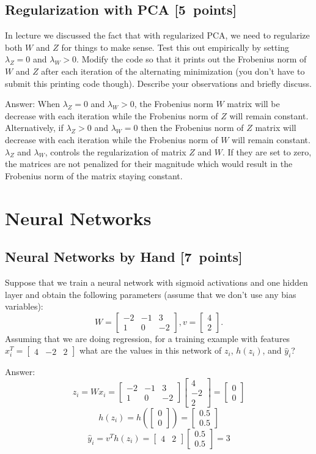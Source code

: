 \documentclass{article}
\newcommand{\blu}[1]{{\textcolor{blu}{#1}}}
\newenvironment{answer}{\par\begingroup\color{gre}Answer: }{\endgroup}
\let\ask\blu
\newcommand\pts[1]{\textcolor{pointscolour}{[#1~points]}}
\newcommand{\mat}[1]{\begin{bmatrix}#1\end{bmatrix}}
\begin{document}
\subsection{Regularization with PCA \pts{5}}

In lecture we discussed the fact that with regularized PCA, we need to regularize both $W$ and $Z$ for things to make sense. Test this out empirically by setting $\lambda_Z=0$ and $\lambda_W>0$. Modify the code so that it prints out the Frobenius norm of $W$ and $Z$ after each iteration of the alternating minimization (you don't have to submit this printing code though). \ask{Describe your observations and briefly discuss.}
\begin{answer}
    When  $\lambda_Z=0$ and $\lambda_W>0$, the Frobenius norm $W$ matrix will be decrease with each iteration while the Frobenius norm of $Z$ will remain constant. Alternatively, if $\lambda_Z>0$ and $\lambda_W=0$ then the Frobenius norm of $Z$ matrix will decrease with each iteration while the Frobenius norm of $W$ will remain constant. $\lambda_Z$ and $\lambda_W$, controls the regularization of matrix $Z$ and $W$. If they are set to zero, the matrices are not penalized for their magnitude which would result in the Frobenius norm of the matrix staying constant.
\end{answer}

\newpage
\section{Neural Networks}

\subsection{Neural Networks by Hand \pts{7}}

Suppose that we train a neural network with sigmoid activations and one hidden layer and obtain the following parameters (assume that we don't use any bias variables):
\[
W = \mat{-2 & -1 & 3\\1 & 0 & -2}, v = \mat{4 \\2}.
\]
Assuming that we are doing regression, \ask{for a training example with features $x_i^T = \mat{4 &-2 & 2}$ what are the values in this network of $z_i$, $h(z_i)$, and $\hat{y}_i$?}

\begin{answer}
    \[
        z_i = Wx_i = \mat{-2 & -1 & 3\\1 & 0 & -2} \mat{4 \\ -2 \\ 2} = \mat{0 \\ 0}
    \]
    \[
        h(z_i) = h \left( \mat{0 \\ 0} \right) = \mat{0.5 \\ 0.5}
    \]
    \[
        \hat{y}_i = v^T h(z_i) = \mat{4 & 2}\mat{0.5 \\ 0.5} = 3
    \]
\end{answer}
\end{document}
